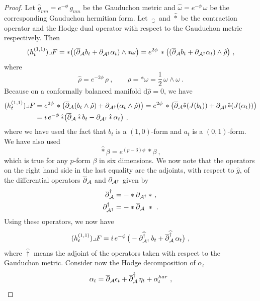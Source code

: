 \documentclass[12pt,a4paper]{article}
\newcommand{\half}{\frac{1}{2}}
\def\bar#1{\overline{#1}}
\let\p=\partial
\def\d{\textrm{d}}
\def\bp{\bar{\partial}}
\theoremstyle{definition}
\begin{document}
\begin{proof}
Let $\hat g_{mn} = e^{- \phi}\, g_{mn}$ be the Gauduchon metric and $\widehat\omega = e^{-\phi}\, \omega$ be the corresponding Gauduchon hermitian form.  Let $\widehat\lrcorner$ and $\hat *$ be the contraction operator and the Hodge dual operator with respect to the Gauduchon metric respectively.  Then
\begin{equation*}
(h_t^{(1,1)})\lrcorner F 
= *\big((\bp_{\cal A} b_t + \p_{{\cal A}^\dagger} \alpha_t) \wedge *\omega\big)
= e^{2\phi}\, *\big((\bp_{\cal A} b_t + \p_{{\cal A}^\dagger} \alpha_t) \wedge\hat\rho \big)~,
\end{equation*}
where 
\begin{equation*}
\hat\rho = e^{-2\phi}\, \rho~,\qquad\rho = *\omega= \half\, \omega\wedge\omega~.
\end{equation*}
Because on a conformally balanced manifold $\d\hat\rho = 0$, we have
\begin{align*}
(h_t^{(1,1)})\lrcorner F 
&= e^{2\phi}\,*\big(\bp_{\cal A}( b_t \wedge\hat\rho) 
+ \p_{{\cal A}^\dagger} (\alpha_t \wedge \hat\rho)\big)
= e^{2\phi}\,* \big(\bp_{\cal A}\hat* (J(b_t)) + \p_{{\cal A}^\dagger} \hat * (J(\alpha_t ))\big)\\
&= i\, e^{-\phi}\,\hat* \big(\bp_{\cal A}\,\hat*\, b_t - \p_{{\cal A}^\dagger}\, \hat * \, \alpha_t \big)~,
\end{align*}
where we have used the fact that $b_t$ is a $(1,0)$-form and $a_t$ is a $(0,1)$-form.  We have also used
\[ \hat *\beta = e^{(p-3)\phi}\, *\beta~,\]
which is true for any $p$-form $\beta$ in six dimensions.
We now note that the operators on the right hand side in the last equality are the adjoints, with respect to $\hat g$, of the differential operators $\bp_{\cal A}$ and $\p_{{\cal A}^\dagger}$ given by
\begin{align*}
\bp_{\cal A}^\dagger &= - *\p_{{\cal A}^\dagger}\,*~,\\
\p_{{\cal A}^\dagger}^\dagger &= - *\bp_{\cal A}\ *~.
\end{align*}
Using these operators, we now have
\begin{equation*}
(h_t^{(1,1)})\lrcorner F = 
i\, e^{-\phi}\,\big(- \p_{{\cal A}^\dagger}^{\widehat\dagger} \,b_t   +  \bp_{\cal A}^{\widehat\dagger}\,\alpha_t \big)~,
\end{equation*}
where $\widehat\dagger$ means the adjoint of the operators taken with respect to the Gauduchon metric.
Consider now the Hodge decomposition of $\alpha_t$
\[ \alpha_t = \bp_{\cal A}\epsilon_t + \bp_{\cal A}^{\hat\dagger}\, \eta_t + \alpha_t^{har}~,\]

\end{proof}
\end{document}
